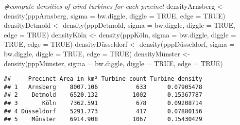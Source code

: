 \documentclass[
]{article}
\newenvironment{Shaded}{\begin{snugshade}}{\end{snugshade}}
\newcommand{\AttributeTok}[1]{\textcolor[rgb]{0.77,0.63,0.00}{#1}}
\newcommand{\CommentTok}[1]{\textcolor[rgb]{0.56,0.35,0.01}{\textit{#1}}}
\newcommand{\ConstantTok}[1]{\textcolor[rgb]{0.00,0.00,0.00}{#1}}
\newcommand{\FunctionTok}[1]{\textcolor[rgb]{0.00,0.00,0.00}{#1}}
\newcommand{\NormalTok}[1]{#1}
\newcommand{\OtherTok}[1]{\textcolor[rgb]{0.56,0.35,0.01}{#1}}
\begin{document}
\begin{Shaded}
\begin{Highlighting}[]
\CommentTok{\#compute densities of wind turbines for each precinct}
\NormalTok{densityArnsberg }\OtherTok{\textless{}{-}} \FunctionTok{density}\NormalTok{(pppArnsberg, }\AttributeTok{sigma =}\NormalTok{ bw.diggle, }\AttributeTok{diggle =} \ConstantTok{TRUE}\NormalTok{, }\AttributeTok{edge =} \ConstantTok{TRUE}\NormalTok{)}
\NormalTok{densityDetmold }\OtherTok{\textless{}{-}} \FunctionTok{density}\NormalTok{(pppDetmold, }\AttributeTok{sigma =}\NormalTok{ bw.diggle, }\AttributeTok{diggle =} \ConstantTok{TRUE}\NormalTok{, }\AttributeTok{edge =} \ConstantTok{TRUE}\NormalTok{)}
\NormalTok{densityKöln }\OtherTok{\textless{}{-}} \FunctionTok{density}\NormalTok{(pppKöln, }\AttributeTok{sigma =}\NormalTok{ bw.diggle, }\AttributeTok{diggle =} \ConstantTok{TRUE}\NormalTok{, }\AttributeTok{edge =} \ConstantTok{TRUE}\NormalTok{)}
\NormalTok{densityDüsseldorf }\OtherTok{\textless{}{-}} \FunctionTok{density}\NormalTok{(pppDüsseldorf, }\AttributeTok{sigma =}\NormalTok{ bw.diggle, }\AttributeTok{diggle =} \ConstantTok{TRUE}\NormalTok{, }\AttributeTok{edge =} \ConstantTok{TRUE}\NormalTok{)}
\NormalTok{densityMünster }\OtherTok{\textless{}{-}} \FunctionTok{density}\NormalTok{(pppMünster, }\AttributeTok{sigma =}\NormalTok{ bw.diggle, }\AttributeTok{diggle =} \ConstantTok{TRUE}\NormalTok{, }\AttributeTok{edge =} \ConstantTok{TRUE}\NormalTok{)}
\end{Highlighting}
\end{Shaded}

\begin{verbatim}
##     Precinct Area in km² Turbine count Turbine density
## 1   Arnsberg    8007.106           633      0.07905478
## 2    Detmold    6520.132          1002      0.15367787
## 3       Köln    7362.591           678      0.09208714
## 4 Düsseldorf    5291.773           417      0.07880156
## 5    Münster    6914.908          1067      0.15430429
\end{verbatim}
\end{document}
